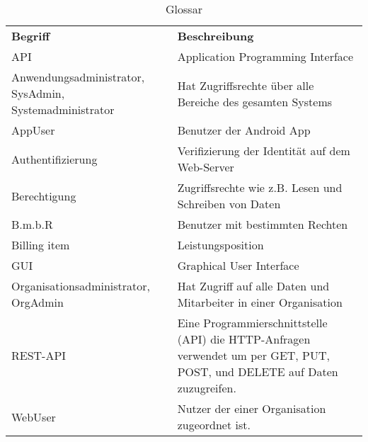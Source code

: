 
\begin{table}[h]
	\centering
	\begin{tabularx}{\textwidth}{X X}
		\rowcolor[HTML]{C0C0C0} 
		\textbf{Begriff} & \textbf{Beschreibung} \\
		
		API & Application Programming Interface\\

		\rowcolor[HTML]{E7E7E7} 
		Anwendungsadministrator, SysAdmin, Systemadministrator  & Hat Zugriffsrechte über alle Bereiche des gesamten Systems \\
		
		AppUser & Benutzer der Android App \\

		\rowcolor[HTML]{E7E7E7} 		
		Authentifizierung & Verifizierung der Identität auf dem Web-Server \\
		
		Berechtigung & Zugriffsrechte wie z.B. Lesen und Schreiben von Daten \\
		
		\rowcolor[HTML]{E7E7E7} 
		B.m.b.R & Benutzer mit bestimmten Rechten \\
		
		Billing item & Leistungsposition \\
		
		\rowcolor[HTML]{E7E7E7} 
		GUI & Graphical User Interface \\
		
		Organisationsadministrator, OrgAdmin & Hat Zugriff auf alle Daten und Mitarbeiter in einer Organisation \\
		
		\rowcolor[HTML]{E7E7E7} 
		REST-API & Eine Programmierschnittstelle (API) die HTTP-Anfragen verwendet um per GET, PUT, POST, und DELETE auf Daten zuzugreifen.\\
		
		WebUser & Nutzer der einer Organisation zugeordnet ist. \\
		
	\end{tabularx}
	\caption{Glossar}
	\label{table:glossar}
\end{table}
